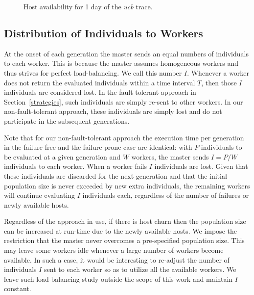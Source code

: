 \documentclass[graybox]{sty/svmult}
\begin{document}
\begin{figure}
    \begin{center}
    \end{center}
    \caption{\label{fig:trazas2}Host availability for 1 day of the \emph{ucb} trace.}
\end{figure}

\subsection{Distribution of Individuals to Workers}
\label{distribution-individuals}

At the onset of each generation the master sends an equal numbers of individuals to each worker.  This is because the master assumes
homogeneous workers and thus strives for perfect load-balancing. We call
this number $I$. Whenever a worker does not return the evaluated individuals
within a time interval $T$, then those $I$ individuals are considered lost. In the
fault-tolerant approach in Section~\ref{strategies}, such individuals
are simply re-sent to other workers. In our non-fault-tolerant approach,
these individuals are simply lost and do not participate in the
subsequent generations. 

Note that for our non-fault-tolerant approach the execution time per
generation in the failure-free and the failure-prone case are
identical: with $P$ individuals to be evaluated at a given generation
and $W$ workers, the master sends $I=P/W$ individuals to
each worker.  When a worker fails $I$ individuals are lost.  Given
that these individuals are discarded for the next generation and that the
initial population size is never exceeded by new extra individuals,
the remaining workers will continue evaluating $I$ individuals each,
regardless of the number of failures or newly available hosts.

Regardless of the approach in use, if there is host churn then the population
size can be increased at run-time due to the newly
available hosts. We impose the restriction that the master never overcomes
a pre-specified population size. This may leave some workers idle whenever
a large number of workers become available. In such a case, it would be 
interesting to re-adjust the number of individuals $I$ sent to each worker 
so as to utilize all the available workers. We leave such load-balancing 
study outside the scope of this work and maintain $I$ constant.
\end{document}
